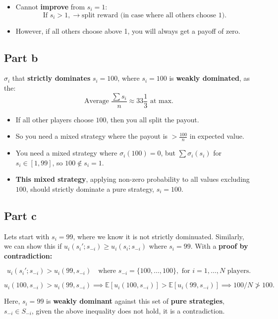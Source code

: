 \documentclass{article}
\begin{document}
\begin{itemize}
    \item Cannot \textbf{improve} from $s_i = 1$:
    \[
    \text{If } s_i > 1, \to \text{split reward (in case where all others choose 1).}
    \]
    \item However, if all others choose above 1, you will always get a payoff of zero.
\end{itemize}

\subsection{Part b}

$\sigma_i$ that \textbf{strictly dominates} $s_i = 100$, where $s_i = 100$ is \textbf{weakly dominated}, as the:
\[
\text{Average } \frac{\sum s_i}{n} \approx 33 \frac{1}{3} \text{ at max.}
\]

\begin{itemize}
    \item If all other players choose $100$, then you all split the payout.
    \item So you need a mixed strategy where the payout is $>\frac{100}{n}$ in expected value.
    \item You need a mixed strategy where $\sigma_i(100) = 0$, but $\sum \sigma_i(s_i)$ for $s_i \in [1, 99]$, so $100 \notin s_i = 1$.
    \item \textbf{This mixed strategy}, applying non-zero probability to all values excluding $100$, should strictly dominate a pure strategy, $s_i = 100$. 
\end{itemize}

\subsection{Part c}
Lets start with $s_i = 99$, where we know it is not strictly dominuated. Similarly, we can show this if $u_i(s_i'; s_{-i}) \geq u_i(s_i; s_{-i})$ where $s_i = 99$. With a \textbf{proof by contradiction:}

\[
u_i(s_i'; s_{-i}) > u_i(99, s_{-i}) \quad \text{where } s_{-i} = \{100, \dots, 100\}, \text{ for } i = 1, \dots, N \text{ players.}
\]

\[
u_i(100, s_{-i}) > u_i(99, s_{-i}) \implies \mathbb{E}[u_i(100, s_{-i})] > \mathbb{E}[u_i(99, s_{-i})] \implies 100/N \ngtr 100.
\]

Here, $s_i = 99$ is \textbf{weakly dominant} against this set of \textbf{pure strategies}, $s_{-i} \in S_{-i}$, given the above inequality does not hold, it is a contradiction. 
\end{document}
